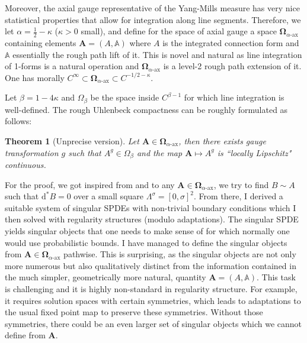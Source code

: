 \documentclass[12pt]{article}
\numberwithin{equation}{section}
\newtheorem{theorem}{Theorem}[section]
\theoremstyle{definition}
\theoremstyle{remark}
\newcommand{\diff}{\mathrm{d}}
\newcommand{\1}{\mathbf 1}
\newcommand{\<}{\langle}
\renewcommand{\>}{\rangle}
\newcommand{\ax}{\text{-}\mathrm{ax}}
\newcommand{\bfA}{\mathbf A}
\newcommand{\bA}{\mathbb A}
\newcommand{\bfOmega}{\boldsymbol{\Omega}}
\begin{document}
Moreover, the axial gauge representative of the Yang-Mills measure has very nice statistical properties that allow for integration along line segments. Therefore, we let $\alpha=\frac 1 2-\kappa$ ($\kappa>0$ small), and define for the space of axial gauge a space $\bfOmega_{\alpha\ax}$ containing elements $\bfA=(A,\bA)$ where $A$ is the integrated connection form and $\bA$ essentially the rough path lift of it. 
%
%
%
This is novel and natural as line integration of 1-forms is a natural operation and $\bfOmega_{\alpha\ax}$ is a level-2 rough path extension of it. 
%
One has morally $C^\infty\subset \bfOmega_{\alpha\ax}\subset C^{-1/2-\kappa}$.


Let $\beta=1-4\kappa$ and $\Omega_\beta$ be the space inside $C^{\beta-1}$ for which line integration is well-defined.  The rough Uhlenbeck compactness can be roughly formulated as follows:
\begin{theorem}[Unprecise version] Let $\bfA\in \bfOmega_{\alpha\ax}$, then there exists gauge transformation $g$ such that $A^g\in \Omega_\beta$ and the map $\bfA\mapsto A^g$ is ``locally Lipschitz" continuous.   
\end{theorem}
%
For the proof, we got inspired from \cite{Uhlenbeck82} and to any $\bfA\in\bfOmega_{\alpha\ax}$,  we try to find $B\sim A$ such that $\diff^*B=0$ over a small square $\Lambda^\sigma=[0,\sigma]^2$. From there, I derived a suitable system of singular SPDEs with non-trivial boundary conditions which I then solved with regularity structures (modulo adaptations). 
%
%
The singular SPDE yields singular objects 
that one needs to make sense of for which normally one would use probabilistic bounds. I have managed to define the singular objects from $\bfA\in\bfOmega_{\alpha\ax}$ pathwise. This is surprising, as the singular objects are not only more numerous but also qualitatively distinct from the information contained in the much simpler, geometrically more natural, quantity $\bfA=(A,\bA)$.  This task is challenging and it is highly non-standard in regularity structure. For example, it requires solution spaces with certain symmetries, which leads to adaptations to the usual fixed point map to preserve these symmetries. Without those symmetries, there could be an even larger set of singular objects which we cannot define from $\bfA$. 
%
\end{document}
